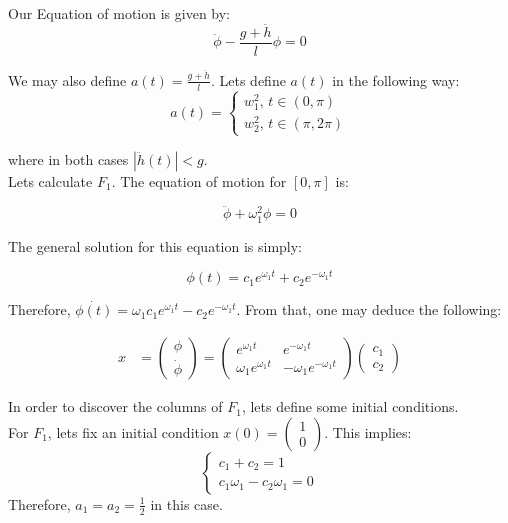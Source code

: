 \documentclass[
course = {{ITVO}},
quartile = {{1}},
assignment = 6,
name = {{Samir Salmen}},
studentnumber = {{NUSP: 11298636}},
email = {{samir.salmen@usp.br}},
firstexercise = 1
]{aga-homework}
\begin{document}
	
	\exercise
	Our Equation of motion is given by:
	\begin{equation}
		\ddot{\phi} - \frac{g + \ddot{h}}{l}\phi = 0
	\end{equation}
	
	We may also define $a(t) = \frac{g + \ddot{h}}{l}$.
		\subexercise
			Lets define $a(t)$ in the following way:
			\begin{equation}
				a(t) =
				\begin{cases}
					w_1^2, \, t \in (0, \pi)\\
					w_2^2, \, t \in (\pi, 2\pi)
				\end{cases}
			\end{equation}
			
			where in both cases $|\ddot{h}(t)| < g$.\\
			
			
			
			Lets calculate $F_1$. The equation of motion for $[0,\pi]$ is:
			
			\begin{equation}
				\ddot{\phi} + \omega_1^2\phi = 0
			\end{equation}
			
			The general solution for this equation is simply:
			
			\begin{equation}
				\phi(t) = c_1e^{\omega_1t}+ c_2e^{-\omega_1t}
			\end{equation}
			
			Therefore, $\dot{\phi(t)} = \omega_1c_1e^{\omega_1t} - c_2e^{-\omega_1t}$. From that, one may deduce the following:
			
			\begin{align}
				x &= \begin{pmatrix}
					\phi\\
					\dot{\phi}
				\end{pmatrix}
				= 		
				\begin{pmatrix}
					e^{\omega_1t} & e^{-\omega_1t}\\
					\omega_1e^{\omega_1t} & -\omega_1e^{-\omega_1t}
				\end{pmatrix} 
				\begin{pmatrix}
					c_1\\
					c_2
				\end{pmatrix}
			\end{align}
			
			In order to discover the columns of $F_1$, lets define some initial conditions.\\
			For $F_1$, lets fix an initial condition $
			x(0) = \begin{pmatrix}
				1\\
				0
			\end{pmatrix}	
			$.
			This implies:
			\begin{equation}
				\begin{cases}
					c_1 + c_2 = 1\\
					c_1 \omega_1 - c_2 \omega_1 = 0
				\end{cases}
			\end{equation}
			Therefore, $a_1 = a_2 = \frac{1}{2}$ in this case.
			
\end{document}
